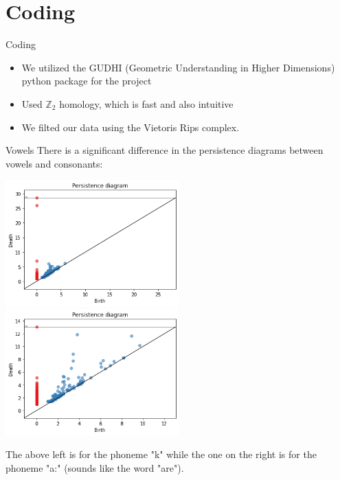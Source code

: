 \documentclass[14pt,aspectratio=169, serif, dvipsnames]{beamer}
\begin{document}
\section{Coding}
\begin{frame}{Coding}
    \begin{itemize}
        \item  We utilized the GUDHI (Geometric Understanding 
        in Higher Dimensions) python package for the project
    
        \item Used $\mathbb{Z}_2$ homology, which is fast and also intuitive
        
        \item We filted our data using the Vietoris Rips complex. 
    \end{itemize}
\end{frame}

\begin{frame}{Vowels}
    There is a significant difference in the persistence diagrams between vowels and consonants: 
    \begin{center}
        \includegraphics[width = 0.5\textwidth]{pictures/k_pers_plot.png}
        \hspace{-0.6cm}
        \includegraphics[width = 0.5\textwidth]{pictures/ar_pers_plot.png}
    \end{center}
    The above left is for the phoneme "k" 
    while the one on the right is for the phoneme "a:" (sounds like the word "are").
\end{frame}
\end{document}
